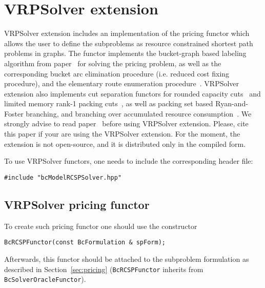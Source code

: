 \documentclass[10pt,a4paper]{article}
\begin{document}
\section{VRPSolver extension}
\label{sec:vrpsolver}

VRPSolver extension includes an implementation of the pricing functor which allows the user to define the subproblems as
resource constrained shortest path problems in graphs. The functor implements the bucket-graph based labeling algorithm
from paper~\cite{SadykovUchoaPessoa:21l} for solving the pricing problem, as well as the corresponding bucket arc
elimination procedure (i.e. reduced cost fixing procedure), and the elementary route enumeration
procedure~\cite{BaldacciChristofiMingozzi:08a}. VRPSolver extension also implements cut separation functors for rounded
capacity cuts~\cite{LaporteNobert:83a} and limited memory rank-1 packing cuts~\cite{PecinPessoaPoggi:17b}, as well as
packing set based Ryan-and-Foster branching, and branching over accumulated resource
consumption~\cite{PessoaSadykovUchoa:21f}. We strongly advise to read paper~\cite{PessoaSadykovUchoa:20a} before using
VRPSolver extension. Please, cite this paper if your are using the VRPSolver extension. For the moment, the extension is not open-source, and it is distributed only in the compiled form. 


To use VRPSolver functors, one needs to include the corresponding header file:
\begin{lstlisting}
#include "bcModelRCSPSolver.hpp"
\end{lstlisting}

\subsection{VRPSolver pricing functor}
\label{sec:vrpsolverpricing}

To create such pricing functor one should use the constructor
\begin{lstlisting}
BcRCSPFunctor(const BcFormulation & spForm);
\end{lstlisting}
Afterwards, this functor should be attached to the subproblem formulation as described in Section~\ref{sec:pricing}
(\verb+BcRCSPFunctor+ inherits from \verb+BcSolverOracleFunctor+).
\end{document}
